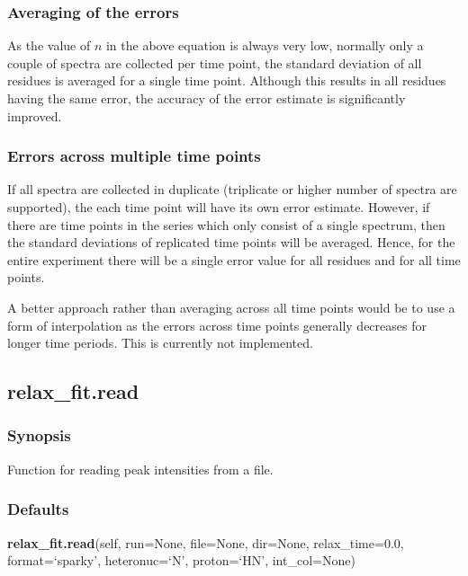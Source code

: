  
 \subsubsection{Averaging of the errors} 

 As the value of $n$ in the above equation is always very low, normally only a couple of spectra are collected per time point, the standard deviation of all residues is averaged for a single time point.  Although this results in all residues having the same error, the accuracy of the error estimate is significantly improved. 
  

  
 \subsubsection{Errors across multiple time points} 

 If all spectra are collected in duplicate (triplicate or higher number of spectra are supported), the each time point will have its own error estimate.  However, if there are time points in the series which only consist of a single spectrum, then the standard deviations of replicated time points will be averaged.  Hence, for the entire experiment there will be a single error value for all residues and for all time points. 
  

 A better approach rather than averaging across all time points would be to use a form of interpolation as the errors across time points generally decreases for longer time periods. This is currently not implemented. 
  

  

 \newpage 

 \subsection{relax\_fit.read} 

  
 \subsubsection{Synopsis} 

 Function for reading peak intensities from a file. 
  

  
 \subsubsection{Defaults} 

 \textsf{\textbf{relax\_fit.read}(self, run=None, file=None, dir=None, relax\_time=0.0, format=`sparky', heteronuc=`N', proton=`HN', int\_col=None)} 

